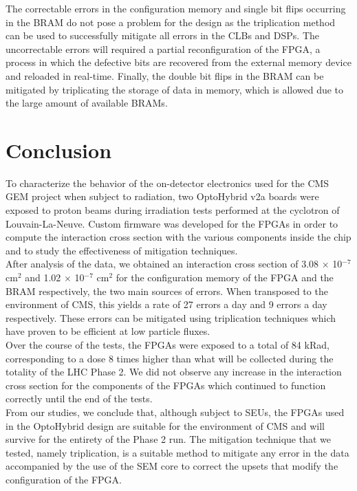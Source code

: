       The correctable errors in the configuration memory and single bit flips occurring in the BRAM do not pose a problem for the design as the triplication method can be used to successfully mitigate all errors in the CLBs and DSPs. The uncorrectable errors will required a partial reconfiguration of the FPGA, a process in which the defective bits are recovered from the external memory device and reloaded in real-time. Finally, the double bit flips in the BRAM can be mitigated by triplicating the storage of data in memory, which is allowed due to the large amount of available BRAMs.

  \section{Conclusion}

    To characterize the behavior of the on-detector electronics used for the CMS GEM project when subject to radiation, two OptoHybrid v2a boards were exposed to proton beams during irradiation tests performed at the cyclotron of Louvain-La-Neuve. Custom firmware was developed for the FPGAs in order to compute the interaction cross section with the various components inside the chip and to study the effectiveness of mitigation techniques.  \\

    After analysis of the data, we obtained an interaction cross section of 3.08 $ \times $ 10$^{-7}$ cm$^{2}$ and 1.02 $ \times $ 10$^{-7}$ cm$^{2}$ for the configuration memory of the FPGA and the BRAM respectively, the two main sources of errors. When transposed to the environment of CMS, this yields a rate of 27 errors a day and 9 errors a day respectively. These errors can be mitigated using triplication techniques which have proven to be efficient at low particle fluxes. \\

    Over the course of the tests, the FPGAs were exposed to a total of 84 kRad, corresponding to a dose 8 times higher than what will be collected during the totality of the LHC Phase 2. We did not observe any increase in the interaction cross section for the components of the FPGAs which continued to function correctly until the end of the tests. \\

    From our studies, we conclude that, although subject to SEUs, the FPGAs used in the OptoHybrid design are suitable for the environment of CMS and will survive for the entirety of the Phase 2 run. The mitigation technique that we tested, namely triplication, is a suitable method to mitigate any error in the data accompanied by the use of the SEM core to correct the upsets that modify the configuration of the FPGA.
